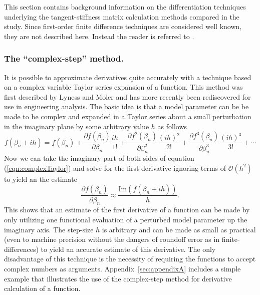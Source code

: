 \documentclass[preprint,12pt]{elsarticle}
\begin{document}
This section contains background information on the differentiation techniques underlying the tangent-stiffness matrix calculation methods compared in the study. Since first-order finite difference techniques are considered well known, they are not described here. Instead the reader is referred to \cite[Chap. 4.1.3]{chapra2010}.

\subsubsection{The ``complex-step'' method.}  
\label{sec:CSmethod}
It is possible to approximate derivatives quite accurately with a technique based on a complex variable Taylor series expansion of a function.  This method was first described by Lyness and Moler \cite{lyness1967numerical, lyness1968differentiation} and has more recently been rediscovered \cite{squire1998using, voorhees2011complex, al2010complex} for use in engineering analysis.  The basic idea is that a model parameter can be be made to be complex and expanded in a Taylor series about a small perturbation in the imaginary plane by some arbitrary value $h$ as follows
%
\begin{equation}
f ( \beta_n + i h ) = f (\beta_n) + \frac{\partial f( \beta_n )}{\partial \beta_n} \frac{i h}{1!} + \frac{\partial f^2(\beta_n)}{\partial \beta_n^2} \frac{(i h)^2}{2!} + \frac{\partial f^3(\beta_n)}{\partial \beta_n^3} \frac{(i h)^3}{3!} + \cdots
\label{eqn:complexTaylor}
\end{equation}
%
Now we can take the imaginary part of both sides of equation (\ref{eqn:complexTaylor}) and solve for the first derivative ignoring terms of $\mathcal{O}\left ( h^2 \right)$ to yield an the estimate
%
\begin{equation}
 \frac{\partial f( \beta_n )}{\partial \beta_n} \approx \frac{\mbox{Im} \left( f (\beta_n + i h) \right)}{h}.
\label{eqn:complexFirstDeriv}
\end{equation}
%
This shows that an estimate of the first derivative of a function can be made by only utilizing one functional evaluation of a perturbed model parameter up the imaginary axis.  The step-size $h$ is arbitrary and can be made as small as practical (even to machine precision without the dangers of roundoff error as in finite-differences) to yield an accurate estimate of this derivative.  The only disadvantage of this technique is the necessity of requiring the functions to accept complex numbers as arguments. Appendix~\ref{sec:appendixA} includes a simple example that illustrates the use of the complex-step method for derivative calculation of a function. 
\end{document}
